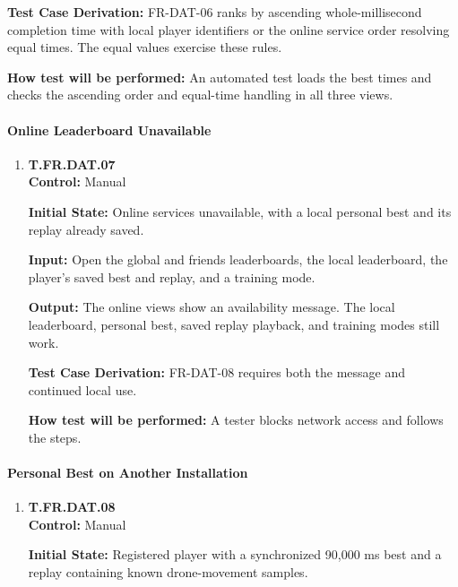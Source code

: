 \documentclass[12pt, titlepage]{article}
\begin{document}
{\begin{enumerate}
\textbf{Test Case Derivation:} \mbox{FR-DAT-06} ranks by ascending whole-millisecond
completion time with local player identifiers or the online service order resolving
equal times. The equal values exercise these rules.

\textbf{How test will be performed:} An automated test loads the best times and
checks the ascending order and equal-time handling in all three views.

\end{enumerate}

\paragraph{Online Leaderboard Unavailable}

\begin{enumerate}

\item{\hypertarget{test-fr-da07}{}\textbf{T.FR.DAT.07}\\}
\textbf{Control:} Manual

\textbf{Initial State:} Online services unavailable, with a local personal best and
its replay already saved.

\textbf{Input:} Open the global and friends leaderboards, the local leaderboard,
the player's saved best and replay, and a training mode.

\textbf{Output:} The online views show an availability message. The local
leaderboard, personal best, saved replay playback, and training modes still work.

\textbf{Test Case Derivation:} \mbox{FR-DAT-08} requires both the message and continued
local use.

\textbf{How test will be performed:} A tester blocks network access and follows the
steps.

\end{enumerate}

\paragraph{Personal Best on Another Installation}

\begin{enumerate}

\item{\hypertarget{test-fr-da08}{}\textbf{T.FR.DAT.08}\\}
\textbf{Control:} Manual

\textbf{Initial State:} Registered player with a synchronized 90,000 ms best and
a replay containing known drone-movement samples.


\end{enumerate}}
\end{document}
